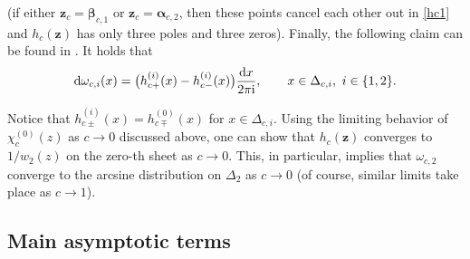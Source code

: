 \documentclass[10pt,a4paper]{amsart}
\numberwithin{equation}{section}
\newcommand{\ic}{\mathrm{i}}
\newcommand{\z}	{{\boldsymbol z}}
\begin{document}
(if either $ \z_c=\boldsymbol\beta_{c,1} $ or $ \z_c=\boldsymbol\alpha_{c,2} $, then these points cancel each other out in \eqref{hc1} and $ h_c(\z) $ has only three poles and three zeros). Finally, the following claim can be found in \cite[Section~4]{ApDenYa21}. It holds that
\begin{equation}
\label{eq_meas}
{\rm d}\omega_{c,i}(x) = \bigl( h_{c+}^{(i)}(x)-h_{c-}^{(i)}(x) \bigr)\frac{{\rm d}x}{2\pi\ic}, \qquad x\in\Delta_{c,i}, \ i\in\{1,2\}.
\end{equation}

Notice that $ h_{c\pm}^{(i)}(x) = h^{(0)}_{c\mp}(x) $ for $ x\in\Delta_{c,i} $. Using the limiting behavior of $ \chi_c^{(0)}(z) $ as $ c\to0 $ discussed above, one can show that $ h_c(\z) $ converges to $ 1/w_2(z) $ on the zero-th sheet as $ c\to0 $. This, in particular, implies that $ \omega_{c,2} $ converge to the arcsine distribution on $ \Delta_2 $ as $ c\to 0 $ (of course, similar limits take place as $ c\to1 $).


\subsection{Main asymptotic terms}
\end{document}

